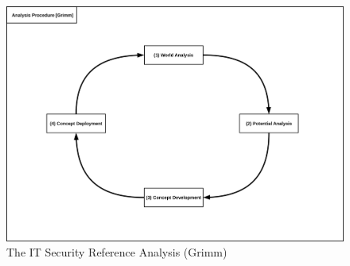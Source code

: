 \begin{figure}
\centering
\includegraphics[width=\textwidth]{diagrams/png/itsec-ref-model-grimm-procedure.png}
\caption{The IT Security Reference Analysis (Grimm)}
\end{figure}
